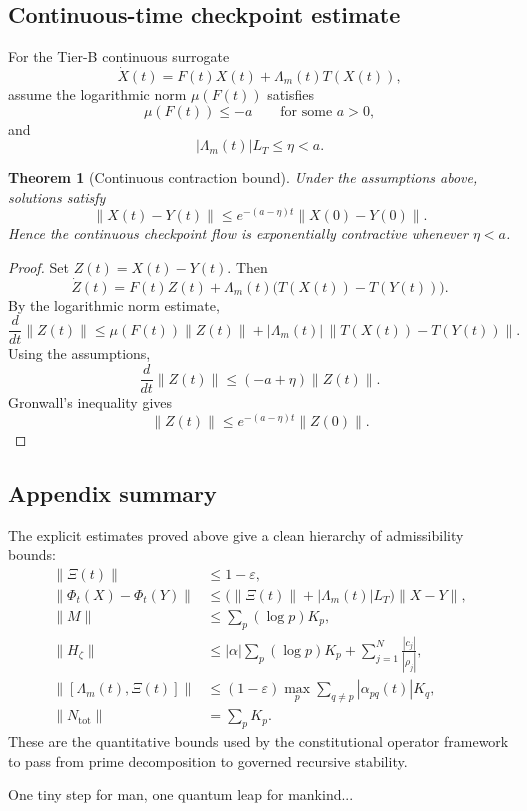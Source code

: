 \documentclass[12pt]{amsart}
\theoremstyle{plain}
\newtheorem{theorem}{Theorem}[section]
\begin{document}
\subsection{Continuous-time checkpoint estimate}

For the Tier-B continuous surrogate
\[
\dot X(t)=F(t)X(t)+\Lambda_m(t)T(X(t)),
\]
assume the logarithmic norm \(\mu(F(t))\) satisfies
\[
\mu(F(t))\le -a
\qquad\text{for some } a>0,
\]
and
\[
|\Lambda_m(t)|L_T\le \eta<a.
\]

\begin{theorem}[Continuous contraction bound]
\label{thm:continuous_bound}
Under the assumptions above, solutions satisfy
\[
\|X(t)-Y(t)\|
\le
e^{-(a-\eta)t}\|X(0)-Y(0)\|.
\]
Hence the continuous checkpoint flow is exponentially contractive whenever \(\eta<a\).
\end{theorem}

\begin{proof}
Set \(Z(t)=X(t)-Y(t)\). Then
\[
\dot Z(t)=F(t)Z(t)+\Lambda_m(t)\bigl(T(X(t))-T(Y(t))\bigr).
\]
By the logarithmic norm estimate,
\[
\frac{d}{dt}\|Z(t)\|
\le
\mu(F(t))\|Z(t)\| + |\Lambda_m(t)|\,\|T(X(t))-T(Y(t))\|.
\]
Using the assumptions,
\[
\frac{d}{dt}\|Z(t)\|
\le
(-a+\eta)\|Z(t)\|.
\]
Gronwall's inequality gives
\[
\|Z(t)\|
\le
e^{-(a-\eta)t}\|Z(0)\|.
\]
\end{proof}

\subsection{Appendix summary}

The explicit estimates proved above give a clean hierarchy of admissibility bounds:
\begin{align*}
\|\Xi(t)\| &\le 1-\varepsilon,\\
\|\Phi_t(X)-\Phi_t(Y)\| &\le \bigl(\|\Xi(t)\|+|\Lambda_m(t)|L_T\bigr)\|X-Y\|,\\
\|M\| &\le \sum_p (\log p)K_p,\\
\|H_\zeta\| &\le |\alpha|\sum_p (\log p)K_p + \sum_{j=1}^N \frac{|c_j|}{|\rho_j|},\\
\|[\Lambda_m(t),\Xi(t)]\| &\le (1-\varepsilon)\max_p \sum_{q\ne p} |\alpha_{pq}(t)|K_q,\\
\|N_{\mathrm{tot}}\| &= \sum_p K_p.
\end{align*}
These are the quantitative bounds used by the constitutional operator framework to pass from prime decomposition to governed recursive stability.
\nocite{*}


\center
 \vspace{10cm}
     \LARGE{One tiny step for man, one quantum leap for mankind... \par}
    \vfill
\end{document}
